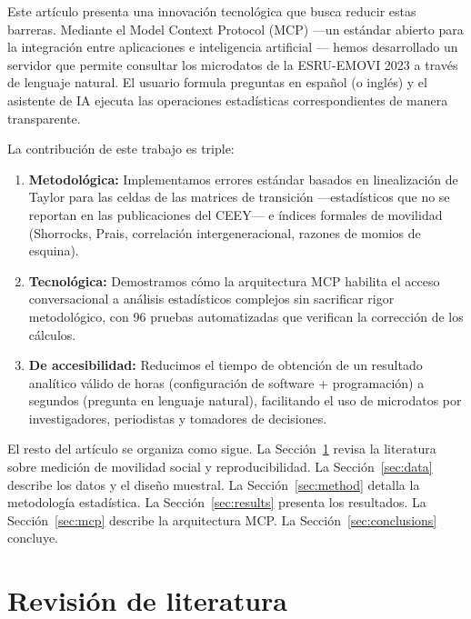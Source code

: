 \documentclass[12pt, a4paper]{article}
\begin{document}
Este artículo presenta una innovación tecnológica que busca reducir estas barreras. Mediante el Model Context Protocol (MCP) ---un estándar abierto para la integración entre aplicaciones e inteligencia artificial \citep{anthropic2024mcp}--- hemos desarrollado un servidor que permite consultar los microdatos de la ESRU-EMOVI 2023 a través de lenguaje natural. El usuario formula preguntas en español (o inglés) y el asistente de IA ejecuta las operaciones estadísticas correspondientes de manera transparente.

La contribución de este trabajo es triple:

\begin{enumerate}
    \item \textbf{Metodológica:} Implementamos errores estándar basados en linealización de Taylor para las celdas de las matrices de transición ---estadísticos que no se reportan en las publicaciones del CEEY--- e índices formales de movilidad (Shorrocks, Prais, correlación intergeneracional, razones de momios de esquina).

    \item \textbf{Tecnológica:} Demostramos cómo la arquitectura MCP habilita el acceso conversacional a análisis estadísticos complejos sin sacrificar rigor metodológico, con 96 pruebas automatizadas que verifican la corrección de los cálculos.

    \item \textbf{De accesibilidad:} Reducimos el tiempo de obtención de un resultado analítico válido de horas (configuración de software + programación) a segundos (pregunta en lenguaje natural), facilitando el uso de microdatos por investigadores, periodistas y tomadores de decisiones.
\end{enumerate}

El resto del artículo se organiza como sigue. La Sección~\ref{sec:lit} revisa la literatura sobre medición de movilidad social y reproducibilidad. La Sección~\ref{sec:data} describe los datos y el diseño muestral. La Sección~\ref{sec:method} detalla la metodología estadística. La Sección~\ref{sec:results} presenta los resultados. La Sección~\ref{sec:mcp} describe la arquitectura MCP. La Sección~\ref{sec:conclusions} concluye.


\section{Revisión de literatura}
\label{sec:lit}
\end{document}
